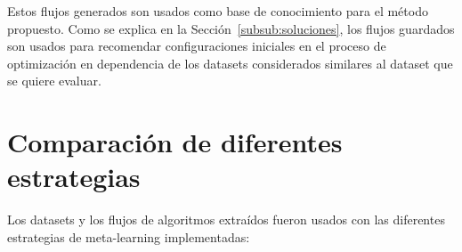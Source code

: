 Estos flujos generados son usados como base de conocimiento para el método propuesto. Como se explica en la Sección~\ref{subsub:soluciones}, los flujos guardados son usados para recomendar configuraciones iniciales en el proceso de optimización en dependencia de los datasets considerados similares al dataset que se quiere evaluar.

\section{Comparación de diferentes estrategias}\label{sec:comparacion}

%

Los datasets y los flujos de algoritmos extraídos fueron usados con las diferentes estrategias de meta-learning implementadas:

